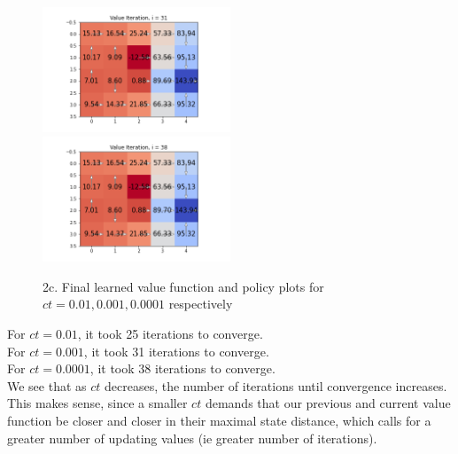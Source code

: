 \documentclass[submit]{harvardml}
\begin{document}
\begin{itemize}
\begin{figure}[h!]
        \includegraphics[width=0.5\textwidth]{HW6/Value_31.png}
        \includegraphics[width=0.5\textwidth]{HW6/Value_38.png}
        \caption{2c. Final learned value function and policy plots for $ct = 0.01, 0.001, 0.0001$ respectively}
    \end{figure}
    For $ct = 0.01$, it took 25 iterations to converge. \\
    For $ct = 0.001$, it took 31 iterations to converge. \\
    For $ct = 0.0001$, it took 38 iterations to converge.\\
    We see that as $ct$ decreases, the number of iterations until convergence increases. This makes sense, since a smaller $ct$ demands that our previous and current value function be closer and closer in their maximal state distance, which calls for a greater number of updating values (ie greater number of iterations).
    

\end{itemize}
\end{document}
